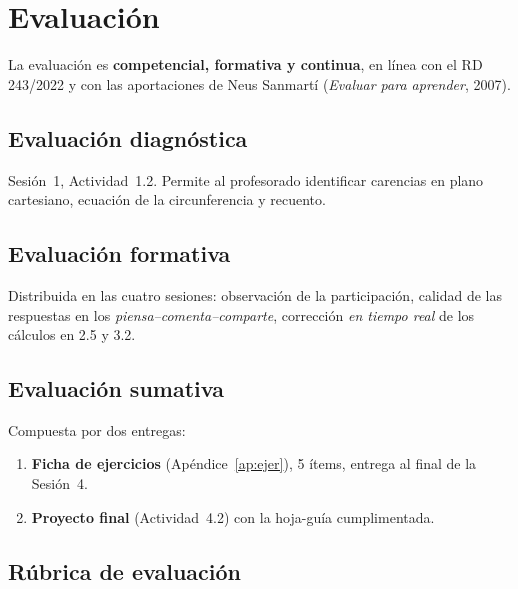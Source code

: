 \documentclass[12pt,a4paper]{scrartcl}
\newcommand{\acc}[1]{\textcolor{accent}{\textbf{#1}}}
\begin{document}
\section{Evaluación}

La evaluación es \acc{competencial, formativa y continua}, en línea con el RD 243/2022 y con las aportaciones de Neus Sanmartí (\emph{Evaluar para aprender}, 2007).

\subsection{Evaluación diagnóstica}
Sesión~1, Actividad~1.2. Permite al profesorado identificar carencias en plano cartesiano, ecuación de la circunferencia y recuento.

\subsection{Evaluación formativa}
Distribuida en las cuatro sesiones: observación de la participación, calidad de las respuestas en los \emph{piensa--comenta--comparte}, corrección \emph{en tiempo real} de los cálculos en 2.5 y 3.2.

\subsection{Evaluación sumativa}
Compuesta por dos entregas:
\begin{enumerate}[leftmargin=1.5em,itemsep=0.2em,topsep=0.3em,nosep]
  \item \textbf{Ficha de ejercicios} (Apéndice~\ref{ap:ejer}), 5 ítems, entrega al final de la Sesión~4.
  \item \textbf{Proyecto final} (Actividad~4.2) con la hoja-guía cumplimentada.
\end{enumerate}

\subsection{Rúbrica de evaluación}
\end{document}
